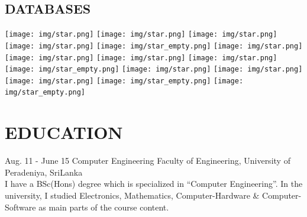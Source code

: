 \documentclass[]{cv-class}
\begin{document}
\begin{aside}
  \section{DATABASES}
    {\texttt{[image: img/star.png]}
    \texttt{[image: img/star.png]}
    \texttt{[image: img/star.png]}
    \texttt{[image: img/star.png]}
    \texttt{[image: img/star\_empty.png]}}
    {\texttt{[image: img/star.png]}
    \texttt{[image: img/star.png]}
    \texttt{[image: img/star.png]}
    \texttt{[image: img/star.png]}
    \texttt{[image: img/star\_empty.png]}}
    {\texttt{[image: img/star.png]}
    \texttt{[image: img/star.png]}
    \texttt{[image: img/star.png]}
    \texttt{[image: img/star\_empty.png]}
    \texttt{[image: img/star\_empty.png]}}    
    ~
\end{aside}

\section{EDUCATION}
\begin{entrylist}
  \entry
    {Aug. 11 - June 15}
    {Computer Engineering}
    {Faculty of Engineering, University of Peradeniya, SriLanka}
    {   \\
        I have a BSc(Hons) degree which is specialized in “Computer Engineering”.
        In the university, I studied Electronics, Mathematics, Computer-Hardware \& Computer-Software as main parts of the course content.
    }
\end{entrylist}
\end{document}

